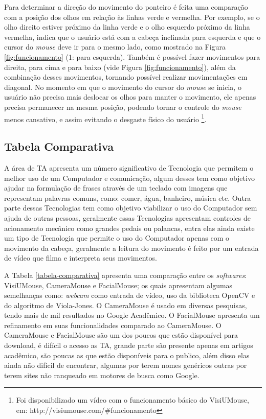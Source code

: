 Para determinar a direção do movimento do ponteiro é feita uma comparação com a posição dos olhos em relação às linhas verde e vermelha. Por exemplo, se o olho direito estiver próximo da linha verde e o olho esquerdo próximo da linha vermelha, indica que o usuário está com a cabeça inclinada para esquerda e que o cursor do \textit{mouse} deve ir para o mesmo lado, como mostrado na Figura \ref{fig:funcionamento} (1: para esquerda). Também é possível fazer movimentos para direita, para cima e para baixo (vide Figura \ref{fig:funcionamento}), além da combinação desses movimentos, tornando possível realizar movimentações em diagonal. No momento em que o movimento do cursor do \textit{mouse} se inicia, o usuário não precisa mais deslocar os olhos para manter o movimento, ele apenas precisa permanecer na mesma posição, podendo tornar o controle do \textit{mouse} menos cansativo, e assim evitando o desgaste físico do usuário \footnote{Foi disponibilizado um vídeo com o funcionamento básico do VisiUMouse, em: http://visiumouse.com/\#funcionamento}. 

\subsection{Tabela Comparativa}\label{Sub:tabela-comparativa}
A área de TA apresenta um número significativo de Tecnologia que permitem o melhor uso de um Computador e comunicação, algum desses tem como objetivo ajudar na formulação de frases através de um teclado com imagens que representam palavras comuns, como: comer, água, banheiro, música etc. Outra parte dessas Tecnologias tem como objetivo viabilizar o uso do Computador sem ajuda de outras pessoas, geralmente essas Tecnologias apresentam controles de acionamento mecânico como grandes pedais ou palancas, entra elas ainda existe  um tipo de Tecnologia que permite o uso do Computador apenas com o movimento da cabeça, geralmente a leitura do movimento é feito por um  entrada de vídeo que filma e interpreta seus movimentos.

A Tabela \ref{tabela-comparativa} apresenta uma comparação entre os \textit{softwares}: VisiUMouse, CameraMouse e FacialMouse; os quais apresentam algumas semelhanças como: \textit{webcam} como entrada de vídeo, uso da biblioteca OpenCV e do algoritmo de Viola-Jones. O CameraMouse é usado em diversas pesquisas, tendo mais de mil resultados no Google Acadêmico. O FacialMouse apresenta um refinamento em suas funcionalidades comparado ao CameraMouse. O CameraMouse e FacialMouse são um dos poucos que estão disponível para download, é difícil o acesso as TA, grande parte são presente apenas em artigos acadêmico, são poucas as que estão disponíveis para o publico, além disso elas ainda não difícil de encontrar, algumas por terem nomes genéricos outras por terem sites não ranqueado em motores de  busca como Google.

